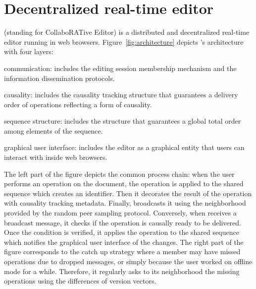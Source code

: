 
\section{Decentralized real-time editor}
\label{sec:editor}


\CRATE (standing for CollaboRATive Editor) is a distributed and decentralized
real-time editor running in web browsers.  Figure~\ref{fig:architecture} depicts
\CRATE's architecture with four layers:
\begin{inparaenum}[(i)]
\item communication: includes the editing session membership mechanism and the
  information dissemination protocols.
\item causality: includes the causality tracking structure that guarantees a
  delivery order of operations reflecting a form of causality.
\item sequence structure: includes the structure that guarantees a global
  total order among elements of the sequence.
\item graphical user interface: includes the editor as a graphical entity that
  users can interact with inside web browsers.
\end{inparaenum}
The left part of the figure depicts the common process chain: when the user
performs an operation on the document, the operation is applied to the shared
sequence which creates an \LSEQ identifier. Then it decorates the result of the
operation with causality tracking metadata. Finally, \CRATE broadcasts it using
the neighborhood provided by the \SPRAY random peer sampling protocol.
Conversely, when \CRATE receives a broadcast message, it checks if the operation
is causally ready to be delivered. Once the condition is verified, it applies
the operation to the shared sequence which notifies the graphical user interface
of the changes.  The right part of the figure corresponds to the catch up
strategy where a member may have missed operations due to dropped messages, or
simply because the user worked on offline mode for a while. Therefore, it
regularly asks to its neighborhood the missing operations using the differences
of version vectors.


